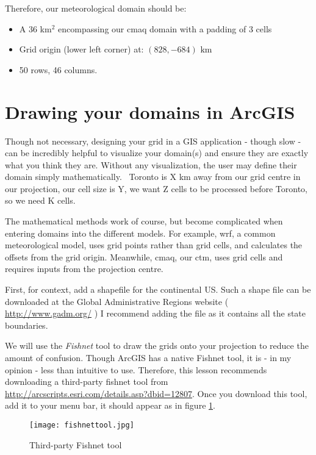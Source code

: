 Therefore, our meteorological domain should be:
\begin{itemize}
	\item A 36 km$^2$ encompassing our \ac{cmaq} domain with a padding of 3 cells
	\item Grid origin (lower left corner) at: $(828, -684) \text{ km}$
	\item 50 rows, 46 columns.
\end{itemize}

\section{Drawing your domains in ArcGIS}
\label{drawing_domains}

Though not necessary, designing your grid in a GIS application -
though slow - can be incredibly helpful to visualize your domain(s)
and ensure they are exactly what you think they are.  Without any
visualization, the user may define their domain simply mathematically.
\eg~Toronto is X km away from our grid centre in our projection, our
cell size is Y, we want Z cells to be processed before Toronto, so we
need K cells.

The mathematical methods work of course, but become complicated when entering
domains into the different models.  For example, \acs{wrf}, a common
meteorological model, uses grid points rather than grid cells, and calculates
the offsets from the grid origin.  Meanwhile, \acs{cmaq}, our \acs{ctm}, uses
grid cells and requires inputs from the projection centre.

First, for context, add a shapefile for the continental US.  Such a
shape file can be downloaded at the Global Administrative Regions
website ( \url{http://www.gadm.org/} ) I recommend adding the
 file as it contains all the state boundaries.

We will use the \emph{Fishnet} tool to draw the grids onto your
projection to reduce the amount of confusion.  Though ArcGIS has a
native Fishnet tool, it is - in my opinion - less than intuitive to
use.  Therefore, this lesson recommends downloading a third-party
fishnet tool from
\url{http://arcscripts.esri.com/details.asp?dbid=12807}.  Once you
download this tool, add it to your menu bar, it should appear as in
figure \ref{fig:fishnet}.

\begin{figure}
	\centering
	\texttt{[image: fishnettool.jpg]}
	\caption{Third-party Fishnet tool}
	\label{fig:fishnet}
\end{figure}

